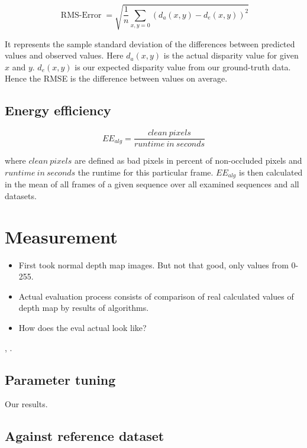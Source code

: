 \begin{equation}
  \operatorname{RMS-Error}=\sqrt{\frac{1}{n} \sum_{x,y=0}^{}(d_a(x,y) - d_e(x,y))^2}
\end{equation}

\noindent It represents the sample standard deviation of the differences between predicted values and observed values.
Here $d_a(x,y)$ is the actual disparity value for given $x$ and $y$.
$d_e(x,y)$ is our expected disparity value from our ground-truth data.
Hence the RMSE is the difference between values on average.

\subsection*{Energy efficiency}

\begin{equation}
  EE_{alg} = \frac{clean\ pixels}{runtime\ in\ seconds}
\end{equation}

\noindent where $clean\ pixels$ are defined as bad pixels in percent of non-occluded pixels and $runtime\ in\ seconds$ the runtime for this particular frame. $EE_{alg}$ is then calculated in the mean of all frames of a given sequence over all examined sequences and all datasets.

\section{Measurement}

\begin{itemize}
	\item First took normal depth map images. But not that good, only values from 0-255.
	\item Actual evaluation process consists of comparison of real calculated values of depth map by results of algorithms.
	\item How does the eval actual look like?
\end{itemize} \citep{benoit2008quality}, \citep{scharstein2002taxonomy}.

\subsection*{Parameter tuning}

Our results.

\subsection*{Against reference dataset}

